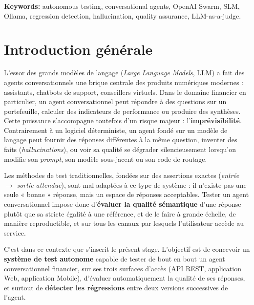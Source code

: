 \documentclass[12pt,a4paper,oneside]{report}
\begin{document}
\vspace{0.2cm}
\noindent\textbf{Keywords:} autonomous testing, conversational agents, OpenAI Swarm,
SLM, Ollama, regression detection, hallucination, quality assurance, LLM-as-a-judge.

\tableofcontents

\clearpage
{}

\chapter*{Introduction générale}

L'essor des grands modèles de langage (\textit{Large Language Models}, LLM) a fait
des agents conversationnels une brique centrale des produits numériques modernes :
assistants, chatbots de support, conseillers virtuels. Dans le domaine financier en
particulier, un agent conversationnel peut répondre à des questions sur un
portefeuille, calculer des indicateurs de performance ou produire des synthèses.
Cette puissance s'accompagne toutefois d'un risque majeur : l'\textbf{imprévisibilité}.
Contrairement à un logiciel déterministe, un agent fondé sur un modèle de langage peut
fournir des réponses différentes à la même question, inventer des faits
(\textit{hallucinations}), ou voir sa qualité se dégrader silencieusement lorsqu'on
modifie son \textit{prompt}, son modèle sous-jacent ou son code de routage.

Les méthodes de test traditionnelles, fondées sur des assertions exactes
(\textit{entrée} $\rightarrow$ \textit{sortie attendue}), sont mal adaptées à ce type
de système : il n'existe pas une seule « bonne » réponse, mais un espace de réponses
acceptables. Tester un agent conversationnel impose donc d'\textbf{évaluer la qualité
sémantique} d'une réponse plutôt que sa stricte égalité à une référence, et de le
faire à grande échelle, de manière reproductible, et sur tous les canaux par lesquels
l'utilisateur accède au service.

C'est dans ce contexte que s'inscrit le présent stage. L'objectif est de concevoir un
\textbf{système de test autonome} capable de tester de bout en bout un agent
conversationnel financier, sur ses trois surfaces d'accès (API REST, application Web,
application Mobile), d'évaluer automatiquement la qualité de ses réponses, et surtout
de \textbf{détecter les régressions} entre deux versions successives de l'agent.
\end{document}
